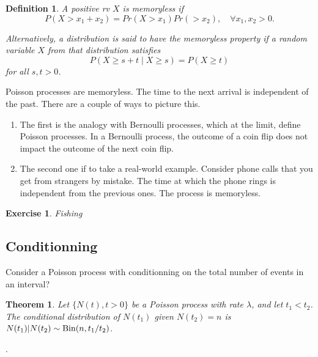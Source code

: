 \documentclass[12pt,a4paper]{article}
\newtheorem{theorem}{Theorem}
\newtheorem{definition}{Definition}
\newtheorem{exercise}{Exercise}
\begin{document}
\begin{definition}
	A positive rv $X$ is memoryless if 
	\begin{equation}
		P(X>x_1+x_2) = Pr(X>x_1)Pr(>x_2), \quad\forall x_1,x_2>0.
	\end{equation}
	
	Alternatively, a distribution is said to have the memoryless property if a random variable $X$ from that distribution satisfies
	\[
	P(X \geq s + t \mid X \geq s) = P(X \geq t)
	\]
	for all $s, t > 0$.
\end{definition}
Poisson processes are memoryless. The time to the next arrival is independent of the past.
There are a couple of ways to picture this. 
\begin{enumerate}
	\item 
	The first is the analogy with Bernoulli processes, which at the limit, define Poisson processes. In a Bernoulli process, the outcome of a coin flip does not impact the outcome of the next coin flip.
	\item	The second one if to take a real-world example. Consider phone calls that you get from strangers by mistake. The time at which the phone rings is independent from the previous ones. The process is memoryless. 
\end{enumerate}

\begin{exercise}
	Fishing 
\end{exercise}

\subsection{Conditionning}
Consider a Poisson process with conditionning on the total number
of events in an interval?
\begin{theorem}
	Let $\{N (t), t > 0\}$ be a Poisson process with
	rate $\lambda$, and let $t_1 < t_2$. 
	The conditional distribution of $N(t_1)$ given $N(t_2) = n$
	is
	$N (t_1) | N (t_2) \sim {\rm Bin}(n,t_1/t_2)$.
\end{theorem}
.
\end{document}
